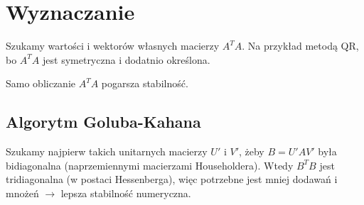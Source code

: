 \section{Wyznaczanie}
Szukamy wartości i wektorów własnych macierzy \( A^TA \). Na przykład metodą QR, bo \( A^TA \) jest symetryczna i dodatnio określona.
\begin{warning}
    Samo obliczanie \( A^TA \) pogarsza stabilność.
\end{warning}

\subsection{Algorytm Goluba-Kahana}
Szukamy najpierw takich unitarnych macierzy \( U' \) i \( V' \), żeby \( B = U'AV' \) była bidiagonalna (naprzemiennymi macierzami Householdera). Wtedy \( B^TB \) jest tridiagonalna (w postaci Hessenberga), więc potrzebne jest mniej dodawań i mnożeń \( \rightarrow \) lepsza stabilność numeryczna.